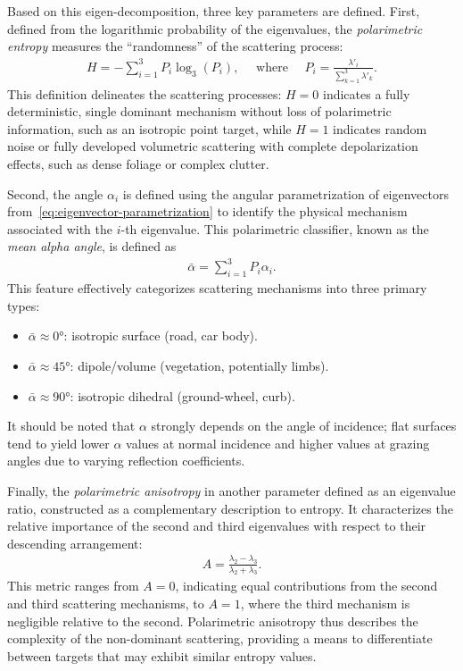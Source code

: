 Based on this eigen-decomposition, three key parameters are defined.
First, defined from the logarithmic probability of the eigenvalues, the \emph{polarimetric entropy} measures the \enquote{randomness} of the scattering process:
\begin{align}
    \label{eq:polarimetric-entropy}
    H = -\sum_{i=1}^3 P_i \log_3(P_i), \quad\text{ where }\quad P_i = \frac{\lambda'_i}{\sum_{k=1}^3 \lambda'_k}.
\end{align}
This definition delineates the scattering processes: $H=0$ indicates a fully deterministic, single dominant mechanism without loss of polarimetric information, such as an isotropic point target, while $H=1$ indicates random noise or fully developed volumetric scattering with complete depolarization effects, such as dense foliage or complex clutter.

Second, the angle $\alpha_i$ is defined using the angular parametrization of eigenvectors from~\cref{eq:eigenvector-parametrization} to identify the physical mechanism associated with the $i$-th eigenvalue.
This polarimetric classifier, known as the \emph{mean alpha angle}, is defined as
\begin{align}
    \label{eq:mean-alpha-angle}
    \bar{\alpha} = \sum_{i=1}^3 P_i \alpha_i.
\end{align}
This feature effectively categorizes scattering mechanisms into three primary types:
\begin{itemize}
    \item $\bar{\alpha} \approx \ang{0}$: isotropic surface (road, car body).
    \item $\bar{\alpha} \approx \ang{45}$: dipole/volume (vegetation, potentially limbs).
    \item $\bar{\alpha} \approx \ang{90}$: isotropic dihedral (ground-wheel, curb).
\end{itemize}
It should be noted that $\alpha$ strongly depends on the angle of incidence; flat surfaces tend to yield lower $\alpha$ values at normal incidence and higher values at grazing angles due to varying reflection coefficients.

Finally, the \emph{polarimetric anisotropy} in another parameter defined as an eigenvalue ratio, constructed as a complementary description to entropy.
It characterizes the relative importance of the second and third eigenvalues with respect to their descending arrangement:
\begin{align}
    A = \frac{\lambda_2 - \lambda_3}{\lambda_2 + \lambda_3}.
\end{align}
This metric ranges from $A=0$, indicating equal contributions from the second and third scattering mechanisms, to $A=1$, where the third mechanism is negligible relative to the second.
Polarimetric anisotropy thus describes the complexity of the non-dominant scattering, providing a means to differentiate between targets that may exhibit similar entropy values.

